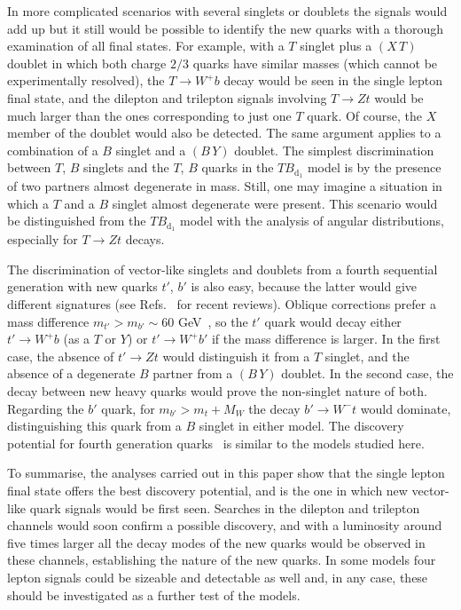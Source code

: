 \documentclass[12pt,a4paper]{article}
\newcommand{\TBd}{TB_{\text{d}_1}}
\newcommand{\XT}{(X \, T)}
\newcommand{\BY}{(B \, Y)}
\begin{document}
In more complicated scenarios with several singlets or doublets the signals would add up but it still would be possible to identify the new quarks with a thorough examination of all final states. For example, with a $T$ singlet plus a $\XT$ doublet in which both charge $2/3$ quarks have similar masses (which cannot be experimentally resolved), the $T \to W^+ b$ decay would be seen in the single lepton final state, and the
dilepton and trilepton signals involving $T \to Zt$ would be much larger than the ones corresponding to just one $T$ quark. Of course, the $X$ member of the doublet would also be detected. The same argument applies to a combination of a $B$ singlet and a $\BY$ doublet.
The simplest discrimination between $T$, $B$ singlets and the $T$, $B$ quarks in the $\TBd$ model is by the presence of two partners almost degenerate in mass. Still, one may imagine a situation in which a $T$ and a $B$ singlet almost degenerate were present. This scenario would be distinguished from the $\TBd$ model with the analysis of angular distributions, especially for $T \to Zt$ decays.

The discrimination of vector-like singlets and doublets from a fourth sequential generation with new quarks $t'$, $b'$
is also easy, because the latter would give different signatures (see Refs.~\cite{delAguila:2008iz,Holdom:2009rf} for recent reviews). Oblique corrections prefer a mass difference $m_{t'} > m_{b'} \sim 60$ GeV~\cite{Kribs:2007nz}, so the $t'$ quark would decay either $t' \to W^+ b$ (as a $T$ or $Y$) or $t' \to W^+ b'$ if the mass difference is larger. In the first case, the absence of $t' \to Zt$ would distinguish it from a $T$ singlet, and the absence of a degenerate $B$ partner from a $\BY$ doublet. In the second case, the decay between new heavy quarks would prove the non-singlet nature of both.
Regarding the $b'$ quark, for $m_{b'} > m_{t} + M_W$ the decay $b' \to W^- t$ would dominate, distinguishing this quark from a $B$ singlet in either model. The discovery potential for fourth generation quarks~\cite{Ozcan:2008zz,Burdman:2008qh} is similar to the models studied here.


To summarise, the analyses carried out in this paper show that the single lepton final state offers the best discovery potential, and is the one in which new vector-like quark signals would be first seen. Searches in the dilepton and trilepton channels would soon confirm a possible discovery, and with a luminosity around five times larger all the decay modes of the new quarks would be observed in these channels, establishing the nature of the new quarks. 
In some models four lepton signals could be sizeable and detectable as well and, in any case, these should be investigated as a further test of the models. 
\end{document}
